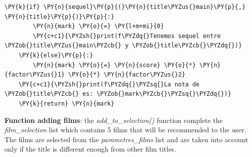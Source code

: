 \begin{tcolorbox}[breakable, size=fbox, boxrule=1pt, pad at break*=1mm,colback=cellbackground, colframe=cellborder]
\begin{Verbatim}[commandchars=\\\{\}]
    \PY{k}{if} \PY{n}{sequel}\PY{p}{(}\PY{n}{title\PYZus{}main}\PY{p}{,} \PY{n}{title}\PY{p}{)}\PY{p}{:}
        \PY{n}{mark} \PY{o}{=} \PY{l+m+mi}{0}
        \PY{c+c1}{\PYZsh{}print(f\PYZdq{}Tenemos sequel entre \PYZob{}title\PYZus{}main\PYZcb{} y \PYZob{}title\PYZcb{}\PYZdq{})}
    \PY{k}{else}\PY{p}{:}
        \PY{n}{mark} \PY{o}{=} \PY{n}{score} \PY{o}{*} \PY{n}{factor\PYZus{}1} \PY{o}{*} \PY{n}{factor\PYZus{}2}
    \PY{c+c1}{\PYZsh{}print(f\PYZdq{}\PYZsq{}La nota de \PYZob{}title\PYZcb{} es: \PYZob{}mark\PYZcb{}\PYZsq{}\PYZdq{})}
    \PY{k}{return} \PY{n}{mark}
\end{Verbatim}
\end{tcolorbox}

    \textbf{Function adding films}: the \emph{add\_to\_selection()} function
complete the \emph{film\_selection} list which contains 5 films that
will be recommended to the user. The films are selected from the
\emph{parametres\_films} list and are taken into account only if the
title is different enough from other film titles.

